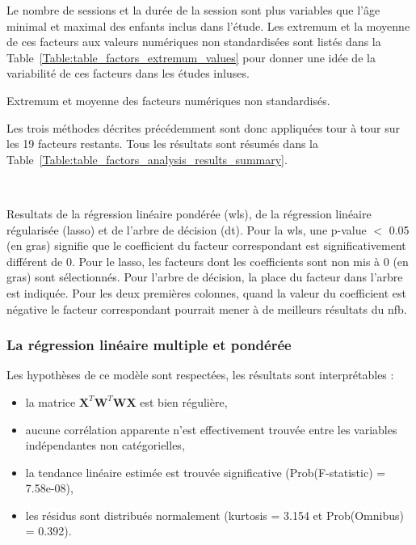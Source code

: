 Le nombre de sessions et la durée de la session sont plus variables que l'âge minimal et maximal des enfants inclus dans l'étude. Les extremum et la moyenne de ces facteurs aux valeurs numériques
non standardisées sont listés dans la Table~\ref{Table:table_factors_extremum_values} pour donner une idée de la variabilité de ces facteurs dans les études inluses. 

\begin{table}[h!]
  \centering
  \caption{Extremum et moyenne des facteurs numériques non standardisés.}
  
  \label{Table:table_factors_extremum_values}
\end{table}

Les trois méthodes décrites précédemment sont donc appliquées tour à tour sur les 19 facteurs restants. Tous les résultats sont résumés dans la Table~\ref{Table:table_factors_analysis_results_summary}.

\newpage\
\begin{table}[h!]
  \centering
  \caption{Resultats de la régression linéaire pondérée (\gls{wls}), de la régression linéaire régularisée (\gls{lasso}) et de l'arbre de décision (\gls{dt}). Pour la \gls{wls}, une p-value $<$ 0.05 
	(en gras) signifie que le coefficient du facteur correspondant est significativement différent de 0. Pour le \gls{lasso}, les facteurs dont les coefficients sont non mis à 0 (en gras) sont 
	sélectionnés. Pour l'arbre de décision, la place du facteur dans l'arbre est indiquée. Pour les deux premières colonnes, quand la valeur du coefficient est négative le facteur 
	correspondant pourrait mener à de meilleurs résultats du \gls{nfb}.}
  
  \label{Table:table_factors_analysis_results_summary}
\end{table}

\subsubsection{La régression linéaire multiple et pondérée}

Les hypothèses de ce modèle sont respectées, les résultats sont interprétables :
\begin{itemize}
	\item la matrice ${\textbf{X}}^{T}\textbf{W}^{T}\textbf{WX}$ est bien régulière,
  \item aucune corrélation apparente n'est effectivement trouvée entre les variables indépendantes non catégorielles, 
  \item la tendance linéaire estimée est trouvée significative (Prob(F-statistic) = 7.58e-08),
  \item les résidus sont distribués normalement (kurtosis = 3.154 et Prob(Omnibus) = 0.392).
\end{itemize}

